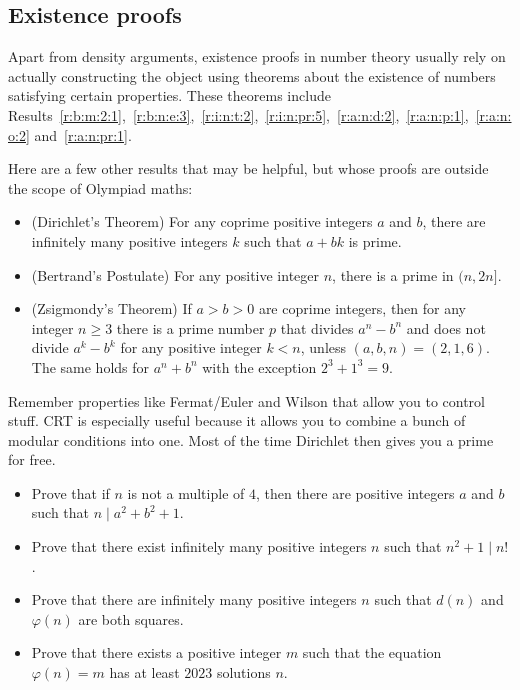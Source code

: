\subsection{Existence proofs}
Apart from density arguments, existence proofs in number theory usually rely on
actually constructing the object using theorems about the existence of numbers
satisfying certain properties. These theorems include
Results~\ref{r:b:m:2:1},~\ref{r:b:n:e:3},~\ref{r:i:n:t:2},~\ref{r:i:n:pr:5},~\ref{r:a:n:d:2},~\ref{r:a:n:p:1},~\ref{r:a:n:o:2}
and~\ref{r:a:n:pr:1}.

Here are a few other results that may be helpful, but whose proofs are outside
the scope of Olympiad maths:
\begin{itemize}
  \item (Dirichlet's Theorem)
    For any coprime positive integers $a$ and $b$, there are infinitely many
    positive integers $k$ such that $a+bk$ is prime.
  \item (Bertrand's Postulate)
    For any positive integer $n$, there is a prime in $(n,2n]$. %
  \item (Zsigmondy's Theorem) If $a>b>0$ are coprime integers, then for any
    integer $n\ge 3$ there is a prime number $p$ that divides $a^n-b^n$ and does
    not divide $a^k-b^k$ for any positive integer $k<n$, unless
    $(a,b,n)=(2,1,6)$. The same holds for $a^n+b^n$ with the exception
    $2^3+1^3=9$.
\end{itemize}
Remember properties like Fermat/Euler and Wilson that allow you to control stuff.
CRT is especially useful because it allows
you to combine a bunch of modular conditions into one. Most of the time
Dirichlet then gives you a prime for free.
\begin{itemize}
  \item Prove that if $n$ is not a multiple of $4$, then there are positive
    integers $a$ and $b$ such that $n\mid a^2+b^2+1$.
  \item Prove that there exist infinitely many positive integers $n$ such that
    $n^2+1\mid n!$.
  \item Prove that there are infinitely many positive integers $n$ such that
    $d(n)$ and $\varphi(n)$ are both squares.
  \item Prove that there exists a positive integer $m$ such that the equation
    $\varphi(n)=m$ has at least $2023$ solutions $n$.
\end{itemize}
